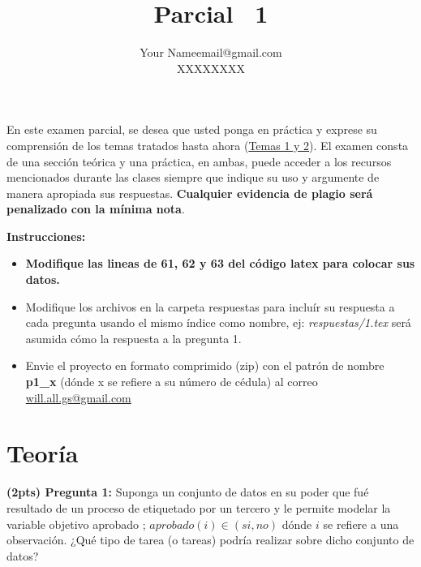 \documentclass[twoside,11pt]{article}
\makeatletter
\newcommand\evaluation{Parcial}
\newcommand\assignmentNumber{1}
\newcommand\studentName{Your Name}            %
\newcommand\studentEmail{email@gmail.com}    %
\newcommand\studentNumber{XXXXXXXX}          %
\makeatother
\begin{document}
    
    \title{\evaluation ~ \assignmentNumber}
    
    \author{\name \studentName \email \studentEmail \\
    \studentNumber
    \addr
    }
    
    \maketitle




En este examen parcial, se desea que usted ponga en pr\'actica y exprese su comprensi\'on de los temas tratados hasta ahora (\href{https://github.com/ucvia/dm/blob/main/nota_informativa.pdf}{Temas 1 y 2}). El examen consta de una secci\'on te\'orica y una pr\'actica, en ambas, puede acceder a los recursos mencionados durante las clases siempre que indique su uso y argumente de manera apropiada sus respuestas. \textbf{Cualquier evidencia de plagio ser\'a penalizado con la m\'inima nota}.

\vskip 0.2in
\textbf{Instrucciones:}
\begin{itemize}
    \item \textbf{Modifique las lineas de 61, 62 y 63 del c\'odigo latex para colocar sus datos.}
    \item Modifique los archivos en la carpeta respuestas para inclu\'ir su respuesta a cada pregunta usando el mismo \'indice como nombre, ej: \textsl{respuestas/1.tex} ser\'a asumida c\'omo la respuesta a la pregunta 1.
    \item Envie el proyecto en formato comprimido (zip) con el patr\'on de nombre \textbf{p1\_x} (d\'onde x se refiere a su n\'umero de c\'edula) al correo \href{mailto:will.all.gs@gmail.com}{will.all.gs@gmail.com}
\end{itemize}

\section*{Teoría}
\label{sec:theory}

\textbf{(2pts) Pregunta 1:} Suponga un conjunto de datos en su poder que fu\'e resultado de un proceso de etiquetado por un tercero y le permite modelar la variable objetivo aprobado ; $aprobado(i) \in (si, no)$ dónde $i$ se refiere a una observaci\'on. ¿Qué tipo de tarea (o tareas) podría realizar sobre dicho conjunto de datos?
\end{document}
